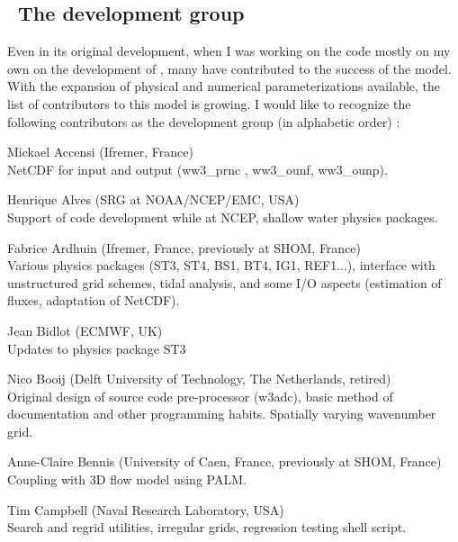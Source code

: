 \vssub
\subsection{~The development group}
\vssub

Even in its original development, when I was working on the code mostly on my
own on the development of \ws, many have contributed to the success of the
model. With the expansion of physical and numerical parameterizations
available, the list of contributors to this model is growing. I would like to
recognize the following contributors as the development group (in alphabetic
order) :

\begin{list}{\ldots}{ }

\item [Mickael Accensi] (Ifremer, France) \\
  NetCDF for input and output (ww3\_prnc , ww3\_ounf, ww3\_ounp).

\item [Henrique Alves] (SRG at NOAA/NCEP/EMC, USA) \\
  Support of code development while at NCEP, shallow water physics packages.

\item [Fabrice Ardhuin] (Ifremer, France, previously at SHOM, France) \\
  Various physics packages (ST3, ST4, BS1, BT4, IG1, REF1...), interface with unstructured grid schemes, tidal analysis, and some I/O aspects (estimation of fluxes, adaptation of NetCDF). 

\item [Jean Bidlot] (ECMWF, UK) \\
  Updates to physics package ST3

\item [Nico Booij] (Delft University of Technology, The Netherlands, retired) \\
  Original design of source code pre-processor ({\code w3adc}), basic method
  of documentation and other programming habits. Spatially varying wavenumber
  grid.

\item [Anne-Claire Bennis] (University of Caen, France, previously at SHOM, France) \\
  Coupling with 3D flow model using PALM.

\item [Tim Campbell] (Naval Research Laboratory, USA)\\ 
  Search and regrid utilities, irregular grids, regression testing
  shell script.


\end{list}
